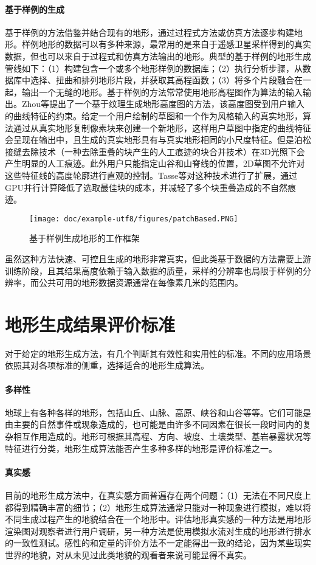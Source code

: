\paragraph{基于样例的生成}
基于样例的方法借鉴并结合现有的地形，通过过程式方法或仿真方法逐步构建地形。样例地形的数据可以有多种来源，最常用的是来自于遥感卫星采样得到的真实数据，但也可以来自于过程式和仿真方法输出的地形。典型的基于样例的地形生成管线如下：（1）构建包含一个或多个地形样例的数据库；（2）执行分析步骤，从数据库中选择、扭曲和排列地形片段，并获取其高程函数；（3）将多个片段融合在一起，输出一个无缝的地形。基于样例的方法常常使用地形高程图作为算法的输入输出。Zhou等\supercite{Zhou2007Terrain}提出了一个基于纹理生成地形高度图的方法，该高度图受到用户输入的曲线特征的约束。给定一个用户绘制的草图和一个作为风格输入的真实地形，算法通过从真实地形复制像素块来创建一个新地形，这样用户草图中指定的曲线特征会呈现在输出中，且生成的真实地形具有与真实地形相同的小尺度特征。但是泊松接缝去除技术（一种去除重叠的块产生的人工痕迹的块合并技术）在3D光照下会产生明显的人工痕迹。此外用户只能指定山谷和山脊线的位置，2D草图不允许对这些特征线的高度轮廓进行直观的控制。Tasse\supercite{TasseEnhanced}等对这种技术进行了扩展，通过GPU并行计算降低了选取最佳块的成本，并减轻了多个块重叠造成的不自然痕迹。\par
\begin{figure}[htbp]
\centering
\texttt{[image: doc/example-utf8/figures/patchBased.PNG]}
\caption{基于样例生成地形的工作框架\supercite{TasseEnhanced}}
\end{figure}
虽然这种方法快速、可控且生成的地形非常真实，但此类基于数据的方法需要上游训练阶段，且其结果高度依赖于输入数据的质量，采样的分辨率也局限于样例的分辨率，而公共可用的地形数据资源通常在每像素几米的范围内。

\section{地形生成结果评价标准}
对于给定的地形生成方法，有几个判断其有效性和实用性的标准。不同的应用场景依照其对各项标准的侧重，选择适合的地形生成算法。\supercite{eric-review}
\paragraph{多样性}
地球上有各种各样的地形，包括山丘、山脉、高原、峡谷和山谷等等。它们可能是由主要的自然事件或现象造成的，也可能是由许多不同因素在很长一段时间内的复杂相互作用造成的。地形可根据其高程、方向、坡度、土壤类型、基岩暴露状况等特征进行分类，地形生成算法能否产生多种多样的地形是评价标准之一。
\paragraph{真实感}
目前的地形生成方法中，在真实感方面普遍存在两个问题：（1）无法在不同尺度上都得到精确丰富的细节；（2）地形生成算法通常只能对一种现象进行模拟，难以将不同生成过程产生的地貌结合在一个地形中。评估地形真实感的一种方法是用地形渲染图对观察者进行用户调研，另一种方法是使用模拟水流对生成的地形进行排水的一致性测试。感性的和定量的评价方法不一定能得出一致的结论，因为某些现实世界的地貌，对从未见过此类地貌的观看者来说可能显得不真实。
